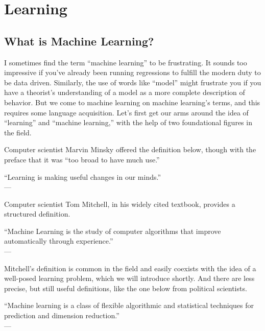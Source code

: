 \section{Learning}

\subsection{What is Machine Learning?}

I sometimes find the term ``machine learning'' to be frustrating. It sounds too impressive if you've already been running regressions to fulfill the modern duty to be data driven. Similarly, the use of words like ``model'' might frustrate you if you have a theorist's understanding of a model as a more complete description of behavior. But we come to machine learning on machine learning's terms, and this requires some language acquisition. Let's first get our arms around the idea of ``learning'' and ``machine learning,'' with the help of two foundational figures in the field.

Computer scientist Marvin Minsky offered the definition below, though with the preface that it was ``too broad to have much use.''

\begin{displayquote}
``Learning is making useful changes in our minds.''\\
--- \cite{minsky1986society}
\end{displayquote}

Computer scientist Tom Mitchell, in his widely cited textbook, provides a structured definition.

\begin{displayquote}
``Machine Learning is the study of computer algorithms that improve automatically through experience.''\\
--- \cite{mitchell1997machine}
\end{displayquote}

Mitchell's definition is common in the field and easily coexists with the idea of a well-posed learning problem, which we will introduce shortly. And there are less precise, but still useful definitions, like the one below from political scientists.

\begin{displayquote}
``Machine learning is a class of flexible algorithmic and statistical techniques for prediction and dimension reduction.''\\
--- \cite{grimmer2021machine}
\end{displayquote}

